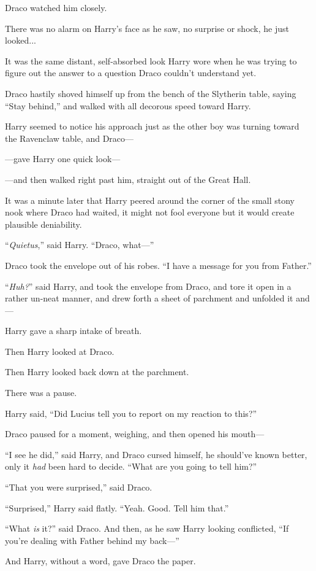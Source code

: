 Draco watched him closely.

There was no alarm on Harry’s face as he saw, no surprise or shock, he just looked...

It was the same distant, self-absorbed look Harry wore when he was trying to figure out the answer to a question Draco couldn’t understand yet.

Draco hastily shoved himself up from the bench of the Slytherin table, saying “Stay behind,” and walked with all decorous speed toward Harry.

Harry seemed to notice his approach just as the other boy was turning toward the Ravenclaw table, and Draco—

—gave Harry one quick look—

—and then walked right past him, straight out of the Great Hall.

It was a minute later that Harry peered around the corner of the small stony nook where Draco had waited, it might not fool everyone but it would create plausible deniability.

“\emph{Quietus},” said Harry. “Draco, what—”

Draco took the envelope out of his robes. “I have a message for you from Father.”

“\emph{Huh?}” said Harry, and took the envelope from Draco, and tore it open in a rather un-neat manner, and drew forth a sheet of parchment and unfolded it and—

Harry gave a sharp intake of breath.

Then Harry looked at Draco.

Then Harry looked back down at the parchment.

There was a pause.

Harry said, “Did Lucius tell you to report on my reaction to this?”

Draco paused for a moment, weighing, and then opened his mouth—

“I see he did,” said Harry, and Draco cursed himself, he should’ve known better, only it \emph{had} been hard to decide. “What are you going to tell him?”

“That you were surprised,” said Draco.

“Surprised,” Harry said flatly. “Yeah. Good. Tell him that.”

“What \emph{is} it?” said Draco. And then, as he saw Harry looking conflicted, “If you’re dealing with Father behind my back—”

And Harry, without a word, gave Draco the paper.

